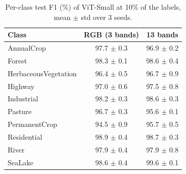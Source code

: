 \begin{table}[t]
\centering
\caption{Per-class test F1 (\%) of ViT-Small at 10\% of the labels, mean $\pm$ std over 3 seeds.}
\label{tab:per_class_f1_10pct}
\small
\begin{tabular}{lcc}
\toprule
Class & RGB (3 bands) & 13 bands \\
\midrule
AnnualCrop & 97.7 $\pm$ 0.3 & 96.9 $\pm$ 0.2 \\
Forest & 98.3 $\pm$ 0.1 & 98.6 $\pm$ 0.4 \\
HerbaceousVegetation & 96.4 $\pm$ 0.5 & 96.7 $\pm$ 0.9 \\
Highway & 97.0 $\pm$ 0.6 & 97.5 $\pm$ 0.8 \\
Industrial & 98.2 $\pm$ 0.3 & 98.6 $\pm$ 0.3 \\
Pasture & 96.7 $\pm$ 0.3 & 95.6 $\pm$ 0.1 \\
PermanentCrop & 94.5 $\pm$ 0.9 & 95.7 $\pm$ 0.5 \\
Residential & 98.9 $\pm$ 0.4 & 98.7 $\pm$ 0.3 \\
River & 97.9 $\pm$ 0.4 & 97.9 $\pm$ 0.8 \\
SeaLake & 98.6 $\pm$ 0.4 & 99.6 $\pm$ 0.1 \\
\bottomrule
\end{tabular}
\end{table}
